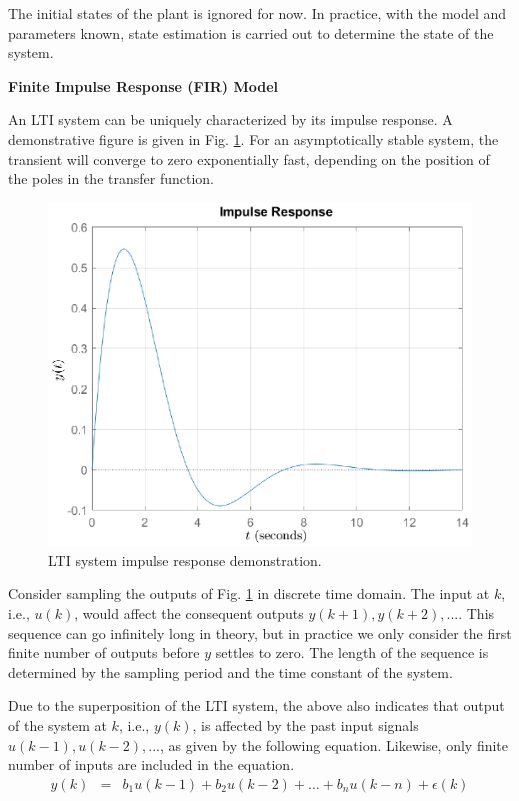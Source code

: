 The initial states of the plant is ignored for now. In practice, with the model and parameters known, state estimation is carried out to determine the state of the system.

\vspace{0.1in}
\noindent \textbf{Finite Impulse Response (FIR) Model}
\vspace{0.1in}

An LTI system can be uniquely characterized by its impulse response. A demonstrative figure is given in Fig. \ref{ch:acs:fig:impulse_second_demo}. For an asymptotically stable system, the transient will converge to zero exponentially fast, depending on the position of the poles in the transfer function.
\begin{figure}
	\centering
	\includegraphics[width=350pt]{chapters/ch-adaptive-control-system/figures/impulse_second_demo.eps}
	\caption{LTI system impulse response demonstration.} \label{ch:acs:fig:impulse_second_demo}
\end{figure}

Consider sampling the outputs of Fig. \ref{ch:acs:fig:impulse_second_demo} in discrete time domain. The input at $k$, i.e., $u(k)$, would affect the consequent outputs $y(k+1), y(k+2), ...$. This sequence can go infinitely long in theory, but in practice we only consider the first finite number of outputs before $y$ settles to zero. The length of the sequence is determined by the sampling period and the time constant of the system.

Due to the superposition of the LTI system, the above also indicates that output of the system at $k$, i.e., $y(k)$, is affected by the past input signals $u(k-1), u(k-2), ...$, as given by the following equation. Likewise, only finite number of inputs are included in the equation.
\begin{eqnarray}
	y(k) &=& b_1u(k-1) + b_2u(k-2) + \ldots + b_nu(k-n) + \epsilon(k) \label{eq:firmodel}
\end{eqnarray}

